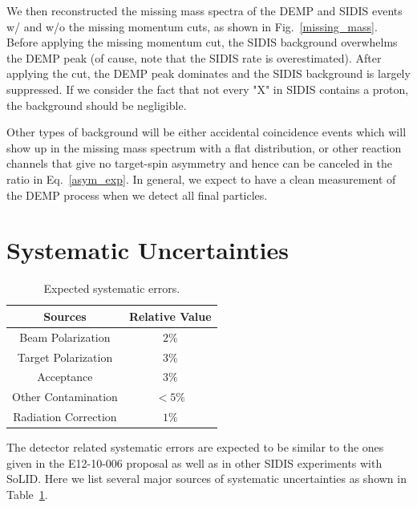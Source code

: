 We then reconstructed the missing mass spectra of the DEMP and SIDIS events w/ and w/o the missing momentum cuts, as shown in Fig.~\ref{missing_mass}. Before applying the missing momentum cut, the SIDIS background overwhelms the DEMP peak (of cause, note that the SIDIS rate is overestimated). After applying the cut, the DEMP peak dominates and the SIDIS background is largely suppressed. If we consider the fact that not every "X" in SIDIS contains a proton, the background should be negligible. 

Other types of background will be either accidental coincidence events which will show up in the missing mass spectrum with a flat distribution, or other reaction channels that give no target-spin asymmetry and hence can be canceled in the ratio in Eq.~\ref{asym_exp}. In general, we expect to have a clean measurement of the DEMP process when we detect all final particles.

\section{Systematic Uncertainties}
\begin{table}[!htp]
\centering
\begin{tabular}{|c|c|}
\hline
{\bf Sources}                  & {\bf Relative Value} \\\hline
Beam Polarization         & $2\%$ \\\hline 
Target Polarization         & $3\%$ \\\hline 
Acceptance                    & $3\%$ \\\hline
Other Contamination      & $<5\%$ \\\hline
Radiation Correction      & $1\%$ \\\hline
\end{tabular}
\caption{\footnotesize{Expected systematic errors.}}\label{table:det_sys_err}
\end{table}
The detector related systematic errors are expected to be similar to the ones
given in the E12-10-006 proposal as well as in other SIDIS experiments with
SoLID. Here we list several major sources of systematic uncertainties as shown in Table~\ref{table:det_sys_err}.  
